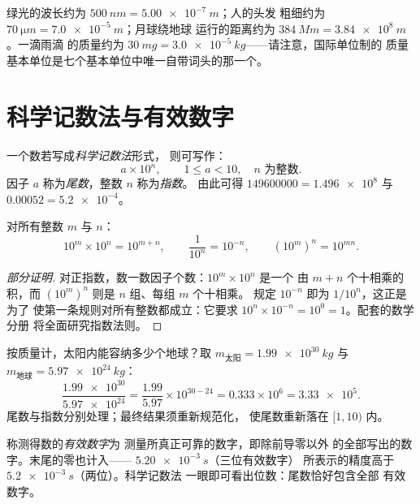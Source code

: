 \begin{example}[读懂词头]\label{ex:g10:orders-of-magnitude:prefixes}
绿光的波长约为 $\qty{500}{nm} = \qty{5.00e-7}{m}$；人的头发
粗细约为 $\qty{70}{\micro m} = \qty{7.0e-5}{m}$；月球绕地球
运行的距离约为 $\qty{384}{Mm} = \qty{3.84e8}{m}$。一滴雨滴
的质量约为 $\qty{30}{mg} = \qty{3.0e-5}{kg}$——请注意，国际单位制的
质量基本单位是七个基本单位中唯一自带词头的那一个。
\end{example}

\section{科学记数法与有效数字}

\begin{definition}[科学记数法]\label{def:g10:orders-of-magnitude:scinot}
一个数若写成\emph{科学记数法}形式，
则可写作：
\[
a \times 10^{n}, \qquad 1 \leq a < 10, \quad n \text{ 为整数.}
\]
因子 $a$ 称为\emph{尾数}，整数
$n$ 称为\emph{指数}。
由此可得 $\num{149600000} = \num{1.496e8}$ 与
$\num{0.00052} = \num{5.2e-4}$。
\end{definition}

\begin{proposition}[十的幂的运算]\label{prop:g10:orders-of-magnitude:powers}
对所有整数 $m$ 与 $n$：
\[
10^{m} \times 10^{n} = 10^{m+n}, \qquad
\frac{1}{10^{n}} = 10^{-n}, \qquad
\left(10^{m}\right)^{n} = 10^{mn}.
\]
\end{proposition}

\begin{proof}[部分证明]
对正指数，数一数因子个数：$10^{m} \times 10^{n}$ 是一个
由 $m + n$ 个十相乘的积，而 $(10^m)^n$ 则是 $n$ 组、每组 $m$ 个十相乘。
规定 $10^{-n}$ 即为 $1/10^{n}$，这正是为了
使第一条规则对所有整数都成立：它要求
$10^{n} \times 10^{-n} = 10^{0} = 1$。配套的数学分册
将全面研究指数法则。
\end{proof}

\begin{example}[用科学记数法计算]\label{ex:g10:orders-of-magnitude:scinot}
按质量计，太阳内能容纳多少个地球？取
$m_{\text{太阳}} = \qty{1.99e30}{kg}$ 与
$m_{\text{地球}} = \qty{5.97e24}{kg}$：
\[
\frac{\num{1.99e30}}{\num{5.97e24}}
= \frac{1.99}{5.97} \times 10^{30-24}
= 0.333 \times 10^{6}
= \num{3.33e5}.
\]
尾数与指数分别处理；最终结果须重新规范化，
使尾数重新落在 $[1, 10)$ 内。
\end{example}

\begin{definition}[有效数字]\label{def:g10:orders-of-magnitude:sigfig}
称测得数的\emph{有效数字}为
测量所真正可靠的数字，即除前导零以外
的全部写出的数字。末尾的零也计入——
$\qty{5.20e-3}{s}$（三位有效数字）
所表示的精度高于 $\qty{5.2e-3}{s}$（两位）。科学记数法
一眼即可看出位数：尾数恰好包含全部
有效数字。
\end{definition}

